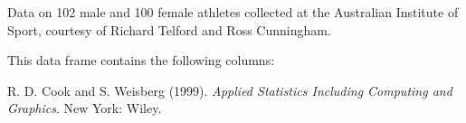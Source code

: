 \begin{Description}\relax
Data on 102 male and 100 female athletes collected at the Australian
Institute of Sport, courtesy of Richard Telford and Ross Cunningham.
\end{Description}
\begin{Format}\relax
This data frame contains the following columns:
\end{Format}
\begin{Details}\relax
\end{Details}
\begin{Source}\relax
R. D. Cook and S. Weisberg (1999). \emph{Applied
Statistics Including Computing and Graphics}.  New York:  Wiley.
\end{Source}

